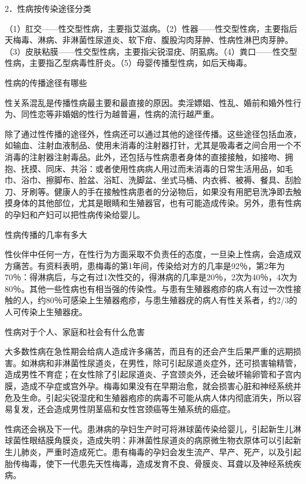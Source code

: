 \documentclass[12pt,UTF8,openany]{ctexbook}
\begin{document}
2．性病按传染途径分类

（1）肛交——性交型性病，主要指艾滋病。（2）性器——性交型性病，主要指后天梅毒、淋病、非淋菌性尿道炎、软下疳、腹股沟肉芽肿、性病性淋巴肉芽肿。（3）皮肤粘膜——性交型性病，主要指尖锐湿疣、阴虱病。（4）粪口——性交型性病，主要指乙型病毒性肝炎。（5）母婴传播型性病，如后天梅毒。





性病的传播途径有哪些


性关系混乱是传播性病最主要和最直接的原因。卖淫嫖娼、性乱、婚前和婚外性行为、同性恋等非婚姻的性行为越普遍，性病的流行越严重。

除了通过性传播的途径外，性病还可以通过其他的途径传播。这些途径包括血液，如输血、注射血液制品、使用未消毒的注射器打针，尤其是吸毒者之间合用一个不消毒的注射器注射毒品。此外，还包括与性病患者身体的直接接触，如接吻、拥抱、抚摸、同床、共浴：或者使用性病病人用过而未消毒的日常生活用品，如毛巾、浴巾、擦脚布、脸盆、浴缸、洗脚盆、坐式马桶、内衣裤、被褥、餐具、刮脸刀、牙刷等。健康人的手在接触性病患者的分泌物后，如果没有用肥皂洗净即去触摸身体的其他部位，尤其是眼睛和生殖器官，也有可能造成传染。另外，患有性病的孕妇和产妇可以把性病传染给婴儿。





性病传播的几率有多大


性伙伴中任何一方，在性行为方面采取不负责任的态度，一旦染上性病，会造成双方痛苦。有资料表明，患梅毒的第1年间，传染给对方的几率是92％，第2年为70％：得淋病后，与之有过1次性交的，得淋病的几率是20％，2次为40％，4次为80％。其他一些性病也有相当强的传染性。与患有生殖器疱疹的病人有过一次性接触的人，约80％可感染上生殖器疱疹，与患生殖器疣的病人有性关系者，约2/3的人可传染上生殖器疣。





性病对于个人、家庭和社会有什么危害


大多数性病在急性期会给病人造成许多痛苦，而且有的还会产生后果严重的远期损害。如淋病和非淋菌性尿道炎，在男性，除可引起尿道炎症外，还可损害输精管，造成男性不育症；在女性除了引起尿道炎、子宫颈炎外，还会破坏输卵管和子宫内膜，造成不孕症或宫外孕。梅毒如果没有在早期治愈，就会损害心脏和神经系统并危及生命。引起尖锐湿疣和生殖器疱疹的病毒不可能从病人体内彻底消失，所以容易复发，还会造成男性阴茎癌和女性宫颈癌等生殖系统的癌症。

性病还会祸及下一代。患淋病的孕妇生产时可将淋球菌传染给婴儿，引起新生儿淋球菌性眼结膜角膜炎，造成失明：非淋菌性尿道炎的病原微生物衣原体可以引起新生儿肺炎，严重时造成死亡。患有梅毒的孕妇会发生流产、早产、死产，以及引起胎传梅毒，使下一代患先天性梅毒，造成发育不良、骨膜炎、耳聋以及神经系统疾病。
\end{document}
